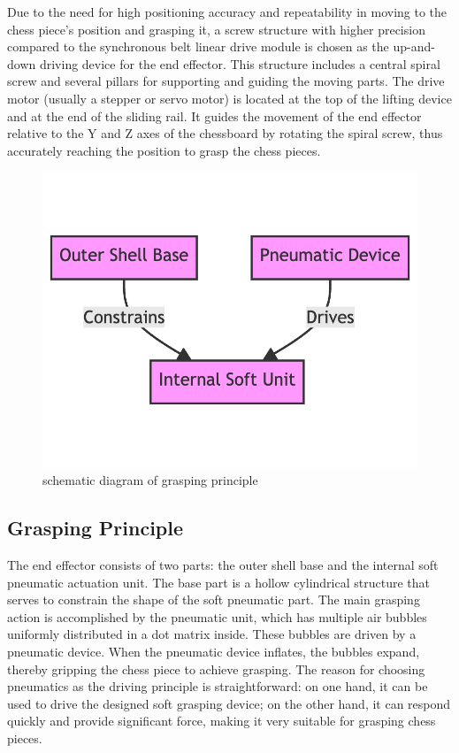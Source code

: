 \documentclass[10pt, a4paper, twocolumn]{article}
\begin{document}
Due to the need for high positioning accuracy and repeatability in moving to the chess piece's position and grasping it, a screw structure with higher precision compared to the synchronous belt linear drive module is chosen as the up-and-down driving device for the end effector. This structure includes a central spiral screw and several pillars for supporting and guiding the moving parts. The drive motor (usually a stepper or servo motor) is located at the top of the lifting device and at the end of the sliding rail. It guides the movement of the end effector relative to the Y and Z axes of the chessboard by rotating the spiral screw, thus accurately reaching the position to grasp the chess pieces.

\begin{figure}
    \centering
    \includegraphics[width=0.6\linewidth]{grasping principle.png}
    \caption{schematic diagram of grasping principle}
    \label{fig:grasping principle}
\end{figure}

\subsection{Grasping Principle}
The end effector consists of two parts: the outer shell base and the internal soft pneumatic actuation unit. The base part is a hollow cylindrical structure that serves to constrain the shape of the soft pneumatic part. The main grasping action is accomplished by the pneumatic unit, which has multiple air bubbles uniformly distributed in a dot matrix inside. These bubbles are driven by a pneumatic device. When the pneumatic device inflates, the bubbles expand, thereby gripping the chess piece to achieve grasping. The reason for choosing pneumatics as the driving principle is straightforward: on one hand, it can be used to drive the designed soft grasping device; on the other hand, it can respond quickly and provide significant force, making it very suitable for grasping chess pieces.
\end{document}
